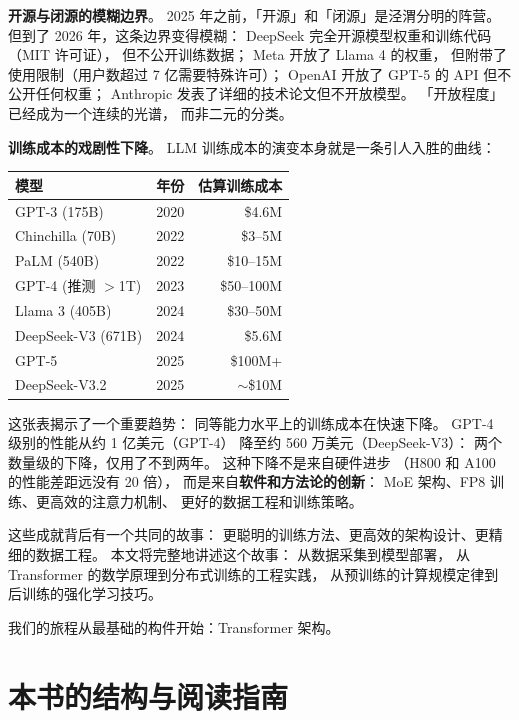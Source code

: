 \textbf{开源与闭源的模糊边界}。
2025 年之前，「开源」和「闭源」是泾渭分明的阵营。
但到了 2026 年，这条边界变得模糊：
DeepSeek 完全开源模型权重和训练代码（MIT 许可证），
但不公开训练数据；
Meta 开放了 Llama 4 的权重，
但附带了使用限制（用户数超过 7 亿需要特殊许可）；
OpenAI 开放了 GPT-5 的 API 但不公开任何权重；
Anthropic 发表了详细的技术论文但不开放模型。
「开放程度」已经成为一个连续的光谱，
而非二元的分类。

\textbf{训练成本的戏剧性下降}。
LLM 训练成本的演变本身就是一条引人入胜的曲线：
\begin{center}\small
\renewcommand{\arraystretch}{1.3}
\begin{tabular}{lrr}
\toprule
\rowcolor{figLightGray}
\textbf{模型} & \textbf{年份} & \textbf{估算训练成本} \\
\midrule
GPT-3 (175B)      & 2020 & \$4.6M \\
Chinchilla (70B)  & 2022 & \$3--5M \\
PaLM (540B)       & 2022 & \$10--15M \\
GPT-4 (推测 $>$1T) & 2023 & \$50--100M \\
Llama 3 (405B)    & 2024 & \$30--50M \\
DeepSeek-V3 (671B)& 2024 & \$5.6M \\
GPT-5             & 2025 & \$100M+ \\
DeepSeek-V3.2     & 2025 & $\sim$\$10M \\
\bottomrule
\end{tabular}
\end{center}

这张表揭示了一个重要趋势：
同等能力水平上的训练成本在快速下降。
GPT-4 级别的性能从约 1 亿美元（GPT-4）
降至约 560 万美元（DeepSeek-V3）：
两个数量级的下降，仅用了不到两年。
这种下降不是来自硬件进步
（H800 和 A100 的性能差距远没有 20 倍），
而是来自\textbf{软件和方法论的创新}：
MoE 架构、FP8 训练、更高效的注意力机制、
更好的数据工程和训练策略。

这些成就背后有一个共同的故事：
更聪明的训练方法、更高效的架构设计、更精细的数据工程。
本文将完整地讲述这个故事：
从数据采集到模型部署，
从 Transformer 的数学原理到分布式训练的工程实践，
从预训练的计算规模定律到后训练的强化学习技巧。

我们的旅程从最基础的构件开始：Transformer 架构。

\section{本书的结构与阅读指南}

